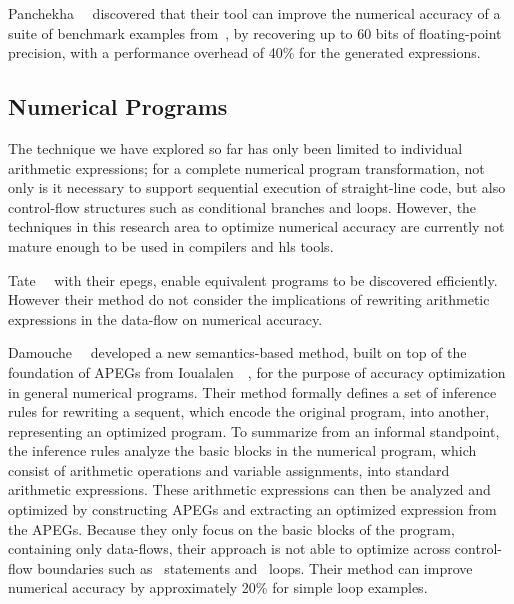 Panchekha~\etal~\cite{panchekha15} discovered that their tool can improve the
numerical accuracy of a suite of benchmark examples from~\cite{hamming86},
by recovering up to 60 bits of floating-point precision, with a performance
overhead of 40\% for the generated expressions.


\subsection{Numerical Programs}
\label{bg:sub:numerical_programs}

The technique we have explored so far has only been limited to individual
arithmetic expressions; for a complete numerical program transformation, not
only is it necessary to support sequential execution of straight-line code,
but also control-flow structures such as conditional branches and loops.
However, the techniques in this research area to optimize numerical accuracy
are currently not mature enough to be used in compilers and \gls{hls} tools.

Tate~\etal~\cite{tate09} with their \glspl{epeg}, enable equivalent programs
to be discovered efficiently.  However their method do not consider the
implications of rewriting arithmetic expressions in the data-flow on numerical
accuracy.

Damouche~\etal~\cite{damouche15} developed a new semantics-based method, built
on top of the foundation of APEGs from Ioualalen~\etal~\cite{ioualalen}, for
the purpose of accuracy optimization in general numerical programs.  Their
method formally defines a set of inference rules for rewriting a sequent,
which encode the original program, into another, representing an optimized
program.  To summarize from an informal standpoint, the inference rules
analyze the basic blocks in the numerical program, which consist of arithmetic
operations and variable assignments, into standard arithmetic expressions.
These arithmetic expressions can then be analyzed and optimized by constructing
APEGs and extracting an optimized expression from the APEGs.  Because they
only focus on the basic blocks of the program, containing only data-flows,
their approach is not able to optimize across control-flow boundaries such as
\iflit~statements and \whilelit~loops.  Their method can improve numerical
accuracy by approximately 20\% for simple loop examples.


